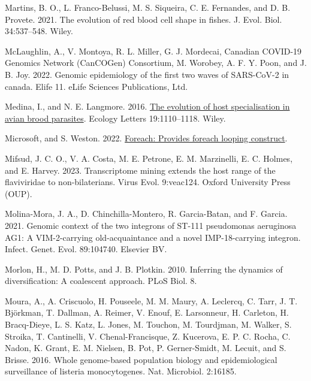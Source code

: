 \documentclass[fleqn,10pt,lineno]{wlpeerj} %
\newlength{\cslhangindent}
\newlength{\cslentryspacingunit} %
\newenvironment{CSLReferences}[2] %
 {%
  \setlength{\parindent}{0pt}
  \ifodd #1
  \let\oldpar\par
  \def\par{\hangindent=\cslhangindent\oldpar}
  \fi
  \setlength{\parskip}{#2\cslentryspacingunit}
 }%
 {}
\begin{document}
\begin{CSLReferences}{1}{0}
\leavevmode{}%
Martins, B. O., L. Franco-Belussi, M. S. Siqueira, C. E. Fernandes, and D. B. Provete. 2021. The evolution of red blood cell shape in fishes. J. Evol. Biol. 34:537--548. Wiley.

\leavevmode{}%
McLaughlin, A., V. Montoya, R. L. Miller, G. J. Mordecai, Canadian COVID-19 Genomics Network (CanCOGen) Consortium, M. Worobey, A. F. Y. Poon, and J. B. Joy. 2022. Genomic epidemiology of the first two waves of {SARS-CoV-2} in canada. Elife 11. eLife Sciences Publications, Ltd.

\leavevmode{}%
Medina, I., and N. E. Langmore. 2016. \href{https://doi.org/10.1111/ele.12649}{The evolution of host specialisation in avian brood parasites}. Ecology Letters 19:1110--1118. Wiley.

\leavevmode{}%
Microsoft, and S. Weston. 2022. \href{https://CRAN.R-project.org/package=foreach}{Foreach: Provides foreach looping construct}.

\leavevmode{}%
Mifsud, J. C. O., V. A. Costa, M. E. Petrone, E. M. Marzinelli, E. C. Holmes, and E. Harvey. 2023. Transcriptome mining extends the host range of the flaviviridae to non-bilaterians. Virus Evol. 9:veac124. Oxford University Press (OUP).

\leavevmode{}%
Molina-Mora, J. A., D. Chinchilla-Montero, R. Garcia-Batan, and F. Garcia. 2021. Genomic context of the two integrons of {ST-111} pseudomonas aeruginosa {AG1}: A {VIM-2-carrying} old-acquaintance and a novel {IMP-18-carrying} integron. Infect. Genet. Evol. 89:104740. Elsevier BV.

\leavevmode{}%
Morlon, H., M. D. Potts, and J. B. Plotkin. 2010. Inferring the dynamics of diversification: A coalescent approach. PLoS Biol. 8.

\leavevmode{}%
Moura, A., A. Criscuolo, H. Pouseele, M. M. Maury, A. Leclercq, C. Tarr, J. T. Björkman, T. Dallman, A. Reimer, V. Enouf, E. Larsonneur, H. Carleton, H. Bracq-Dieye, L. S. Katz, L. Jones, M. Touchon, M. Tourdjman, M. Walker, S. Stroika, T. Cantinelli, V. Chenal-Francisque, Z. Kucerova, E. P. C. Rocha, C. Nadon, K. Grant, E. M. Nielsen, B. Pot, P. Gerner-Smidt, M. Lecuit, and S. Brisse. 2016. Whole genome-based population biology and epidemiological surveillance of listeria monocytogenes. Nat. Microbiol. 2:16185.


\end{CSLReferences}
\end{document}
